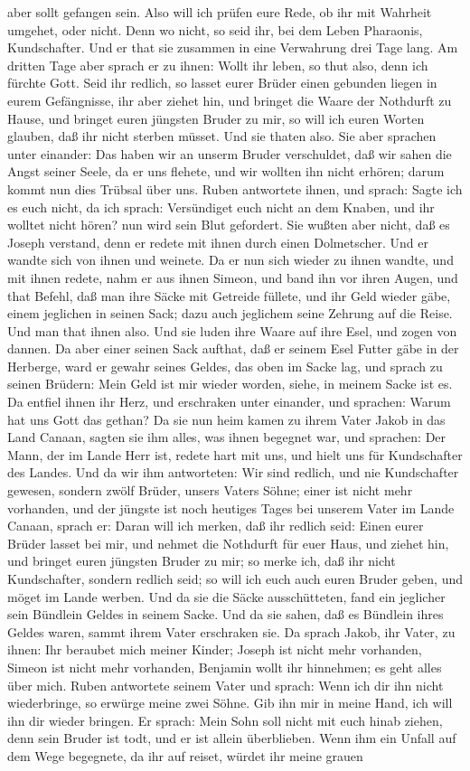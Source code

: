 aber sollt gefangen sein. Also will ich prüfen eure Rede, ob ihr mit Wahrheit umgehet, oder nicht. Denn wo nicht, so seid ihr, bei dem Leben Pharaonis, Kundschafter. Und er that sie zusammen in eine Verwahrung drei Tage lang. Am dritten Tage aber sprach er zu ihnen: Wollt ihr leben, so thut also, denn ich fürchte Gott. Seid ihr redlich, so lasset eurer Brüder einen gebunden liegen in eurem Gefängnisse, ihr aber ziehet hin, und bringet die Waare der Nothdurft zu Hause, und bringet euren jüngsten Bruder zu mir, so will ich euren Worten glauben, daß ihr nicht sterben müsset. Und sie thaten also. Sie aber sprachen unter einander: Das haben wir an unserm Bruder verschuldet, daß wir sahen die Angst seiner Seele, da er uns flehete, und wir wollten ihn nicht erhören; darum kommt nun dies Trübsal über uns. Ruben antwortete ihnen, und sprach: Sagte ich es euch nicht, da ich sprach: Versündiget euch nicht an dem Knaben, und ihr wolltet nicht hören? nun wird sein Blut gefordert. Sie wußten aber nicht, daß es Joseph verstand, denn er redete mit ihnen durch einen Dolmetscher. Und er wandte sich von ihnen und weinete. Da er nun sich wieder zu ihnen wandte, und mit ihnen redete, nahm er aus ihnen Simeon, und band ihn vor ihren Augen, und that Befehl, daß man ihre Säcke mit Getreide füllete, und ihr Geld wieder gäbe, einem jeglichen in seinen Sack; dazu auch jeglichem seine Zehrung auf die Reise. Und man that ihnen also. Und sie luden ihre Waare auf ihre Esel, und zogen von dannen. Da aber einer seinen Sack aufthat, daß er seinem Esel Futter gäbe in der Herberge, ward er gewahr seines Geldes, das oben im Sacke lag, und sprach zu seinen Brüdern: Mein Geld ist mir wieder worden, siehe, in meinem Sacke ist es. Da entfiel ihnen ihr Herz, und erschraken unter einander, und sprachen: Warum hat uns Gott das gethan? Da sie nun heim kamen zu ihrem Vater Jakob in das Land Canaan, sagten sie ihm alles, was ihnen begegnet war, und sprachen: Der Mann, der im Lande Herr ist, redete hart mit uns, und hielt uns für Kundschafter des Landes. Und da wir ihm antworteten: Wir sind redlich, und nie Kundschafter gewesen, sondern zwölf Brüder, unsers Vaters Söhne; einer ist nicht mehr vorhanden, und der jüngste ist noch heutiges Tages bei unserem Vater im Lande Canaan, sprach er: Daran will ich merken, daß ihr redlich seid: Einen eurer Brüder lasset bei mir, und nehmet die Nothdurft für euer Haus, und ziehet hin, und bringet euren jüngsten Bruder zu mir; so merke ich, daß ihr nicht Kundschafter, sondern redlich seid; so will ich euch auch euren Bruder geben, und möget im Lande werben. Und da sie die Säcke ausschütteten, fand ein jeglicher sein Bündlein Geldes in seinem Sacke. Und da sie sahen, daß es Bündlein ihres Geldes waren, sammt ihrem Vater erschraken sie. Da sprach Jakob, ihr Vater, zu ihnen: Ihr beraubet mich meiner Kinder; Joseph ist nicht mehr vorhanden, Simeon ist nicht mehr vorhanden, Benjamin wollt ihr hinnehmen; es geht alles über mich. Ruben antwortete seinem Vater und sprach: Wenn ich dir ihn nicht wiederbringe, so erwürge meine zwei Söhne. Gib ihn mir in meine Hand, ich will ihn dir wieder bringen. Er sprach: Mein Sohn soll nicht mit euch hinab ziehen, denn sein Bruder ist todt, und er ist allein überblieben. Wenn ihm ein Unfall auf dem Wege begegnete, da ihr auf reiset, würdet ihr meine grauen 